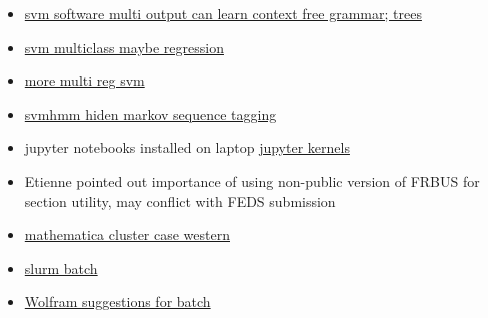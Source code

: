 \documentclass[hyperref]{labbook}
\begin{document}

\begin{itemize}
\item \href{http://www.support-vector-machines.org/SVM_soft.html}{svm software multi output can learn context free grammar; trees}
\item \href{http://www.csie.ntu.edu.tw/~cjlin/bsvm/}{svm multiclass maybe regression}
\item \href{http://people.kyb.tuebingen.mpg.de/spider/}{more multi reg svm}
\end{itemize}



\begin{itemize}
\item \href{https://www.cs.cornell.edu/People/tj/svm_light/svm_hmm.html}{svmhmm hiden markov sequence tagging}
\end{itemize}


\begin{itemize}
\item jupyter notebooks installed on laptop 
\href{https://github.com/jupyter/jupyter/wiki/Jupyter-kernels}{jupyter kernels}
\end{itemize}


\begin{itemize}
\item Etienne pointed out importance of using non-public version of FRBUS for section utility,  may conflict with FEDS submission
\end{itemize}


  \begin{itemize}
  \item \href{https://sites.google.com/a/case.edu/hpc-upgraded-cluster/home/Software-Guide/mathematica}{mathematica cluster case western}
  \item \href{https://rcc.uchicago.edu/docs/software/environments/mathematica/index.html}{slurm batch}
  \item \href{}{Wolfram suggestions for batch}
  \end{itemize}

\end{document}
